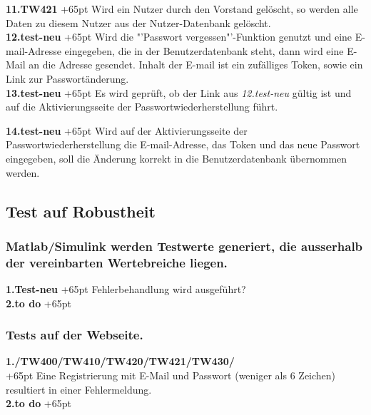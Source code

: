 \documentclass[fontsize = 12pt, paper = a4]{scrreprt}
\begin{document}
\textbf{11.TW421}
\hangindent+65pt 
Wird ein Nutzer durch den Vorstand gelöscht, so werden alle Daten zu diesem Nutzer aus der Nutzer-Datenbank gelöscht.\\

\textbf{12.test-neu}
\hangindent+65pt 
Wird die "'Passwort vergessen"'-Funktion genutzt und eine E-mail-Adresse eingegeben, die in der Benutzerdatenbank steht, dann wird eine E-Mail an die Adresse gesendet. Inhalt der E-mail ist ein zufälliges Token, sowie ein Link zur Passwortänderung. \\

\textbf{13.test-neu}
\hangindent+65pt 
Es wird geprüft, ob der Link aus \textit{12.test-neu} gültig ist und auf die Aktivierungsseite der Passwortwiederherstellung führt.

\textbf{14.test-neu}
\hangindent+65pt 
Wird auf der Aktivierungsseite der Passwortwiederherstellung die E-mail-Adresse, das Token und das neue Passwort eingegeben, soll die Änderung korrekt in die Benutzerdatenbank übernommen werden.

\subsection*{Test auf Robustheit}
\subsubsection*{Matlab/Simulink werden Testwerte generiert, die ausserhalb der vereinbarten Wertebreiche liegen. }


\textbf{1.Test-neu}
\hangindent+65pt 
Fehlerbehandlung wird ausgeführt?\\

\textbf{2.to do}
\hangindent+65pt 


\subsubsection*{Tests auf der Webseite.}


\textbf{1./TW400/TW410/TW420/TW421/TW430/}\\
\hangindent+65pt 
Eine Registrierung mit E-Mail und Passwort (weniger als 6 Zeichen) resultiert in einer Fehlermeldung.\\

\textbf{2.to do}
\hangindent+65pt 


\end{document}
